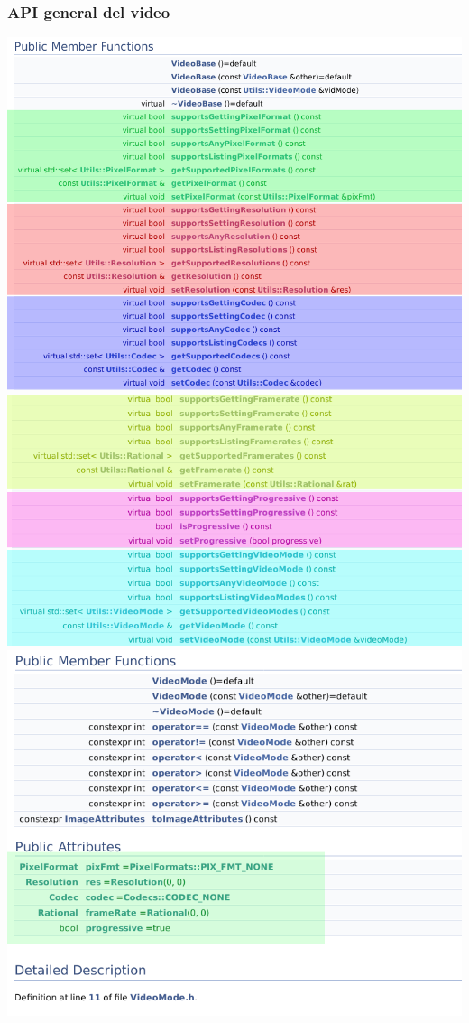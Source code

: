 \documentclass{beamer}
\begin{document}
\begin{frame}[allowframebreaks] \frametitle{API general del video}
\begin{center}
	\includegraphics[height=0.8\textheight]{video_base1} 
	\includegraphics[width=\textwidth]{video_base2} 
	\includegraphics[height=0.8\textheight]{video_mode_struct} 

\end{center}
\end{frame}
\end{document}
